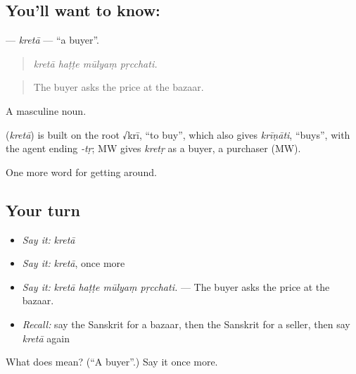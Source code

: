\subsection*{You'll want to know: }
\textbf{} — \emph{kretā} — \textquotedblleft{}a buyer\textquotedblright{}.

\begin{quote}
   
\end{quote}

\begin{quote}
\emph{kretā haṭṭe mūlyaṃ pṛcchati.}
\end{quote}

\begin{quote}
The buyer asks the price at the bazaar.
\end{quote}

A masculine noun.

\begin{cousinweb}
\textbf{} (\emph{kretā}) is built on the root √krī, \textquotedblleft{}to buy\textquotedblright{}, which also gives \emph{krīṇāti}, \textquotedblleft{}buys\textquotedblright{}, with the agent ending \emph{-tṛ}; MW gives \emph{kretṛ} as a buyer, a purchaser (MW).
\end{cousinweb}

\begin{grammarlens}[title={What you've built}]
One more word for getting around.
\end{grammarlens}

\subsection*{Your turn}
\begin{itemize}
\raggedright
  \item \emph{Say it:} \emph{kretā}
  \item \emph{Say it:} \emph{kretā}, once more
  \item \emph{Say it:} \emph{kretā haṭṭe mūlyaṃ pṛcchati.} — The buyer asks the price at the bazaar.
  \item \emph{Recall:} say the Sanskrit for a bazaar, then the Sanskrit for a seller, then say \emph{kretā} again
\end{itemize}

\begin{tcolorbox}[breakable,colback=teal!4,colframe=teal!35!black,title={Before you move on}]
What does  mean? (\textquotedblleft{}A buyer\textquotedblright{}.) Say it once more.
\end{tcolorbox}

